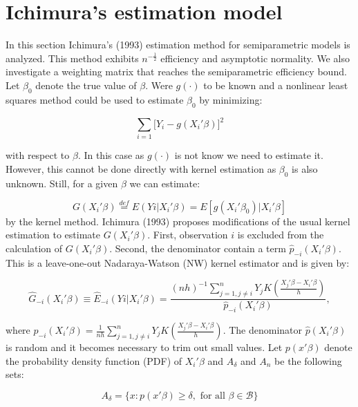 \documentclass[a4paper]{article}
\begin{document}
\section{Ichimura's estimation model} %
\label{sec:Ichimura's estimation model}

In this section Ichimura's (1993) estimation method for semiparametric models is analyzed. This method exhibits $n^{-\frac{1}{2}}$ efficiency and asymptotic normality. We also investigate a weighting matrix that reaches the semiparametric efficiency bound. Let $\beta_0$ denote the true value of $\beta$. Were $g(\cdot)$ to be known and a nonlinear least squares method could be used to estimate $\beta_0$ by minimizing:

\begin{equation}
\sum_{i = 1}\big[Y_i - g(X_i'\beta)\big]^2
\end{equation}

with respect to $\beta$.
In this case as $g(\cdot)$ is not know we need to estimate it. However, this cannot be done directly with kernel estimation as $\beta_0$ is also unknown. Still, for a given $\beta$ we can estimate:

\begin{equation}
G(X_i'\beta) \stackrel{def}{=} E(Yi|X_i'\beta) = E[g(X_i'\beta_0)|X_i'\beta]
\end{equation}
 by the kernel method. Ichimura (1993) proposes modifications of the usual kernel estimation to estimate $G(X_i'\beta)$. First, observation $i$ is excluded from the calculation of $G(X_i'\beta)$. Second, the denominator contain a term $\hat{p}_{-i}(X_i'\beta)$. This is a leave-one-out Nadaraya-Watson (NW) kernel estimator and is given by:

\begin{equation}
\hat{G}_{-i}(X_i'\beta) \equiv \hat{E}_{-i}(Yi|X_i'\beta) = \frac{(nh)^{-1}\sum_{j=1, j \neq i }^{n}  Y_jK(\frac{X_j'\beta - X_i'\beta}{h})}{\hat{p}_{-i}(X_i'\beta)},
\end{equation}

where $\hat{p}_{-i}(X_i'\beta) = \frac{1}{nh}\sum_{j=1,j \neq i}^{n}Y_{j}K(\frac{X_j'\beta - X_i'\beta}{h})$.  The denominator $\hat{p}(X_i'\beta)$ is random and it becomes necessary to trim out small values. Let $p(x'\beta)$ denote the probability density function (PDF) of $X_i'\beta$ and $A_\delta$ and $A_n$ be the following sets:

\[ A_\delta = \{ x : p(x'\beta) \geq \delta, \text{ for all }  \beta \in \mathcal{B} \}
\]
\end{document}
